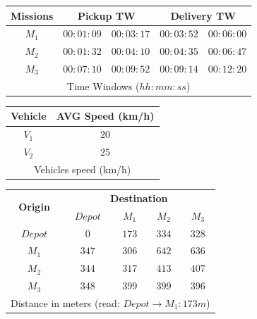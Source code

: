 \documentclass[review]{elsarticle}
\begin{document}
\begin{figure}[h]
\label{example}
 \tiny
 \begin{center}
    \begin{tabular}{|c|c|c|c|c|} 
    \hline
    {\bf Missions} & \multicolumn{2}{|c|}{\bf Pickup TW} & \multicolumn{2}{|c|}{\bf Delivery TW} \\ \hline
    $M_1$	 & $00:01:09$ & $00:03:17$	& $00:03:52$ & $00:06:00$\\
    $M_2$	 & $00:01:32$ & $00:04:10$	& $00:04:35$ & $00:06:47$\\
    $M_3$	 & $00:07:10$ & $00:09:52$	& $00:09:14$ & $00:12:20$\\
    \hline
    \multicolumn{5}{c}{Time Windows ($hh:mm:ss$)}
    \end{tabular}
\end{center}
\begin{center}
    \begin{tabular}{|c|c|} 
    \hline
    {\bf Vehicle} & {\bf AVG Speed (km/h)} \\ \hline
    $V_1$	 & $20$\\
    $V_2$	 & $25$\\
    \hline
    \multicolumn{2}{c}{Vehicles speed (km/h)}
    \end{tabular}
  \end{center}
  
  \begin{center}
    \begin{tabular}{|c|c|c|c|c|} 
    \hline
    
    \multirow{2}{*}{\bf{Origin}} & \multicolumn{4}{c|}{\bf{Destination}}\\ \cline{2-5}
    	 	& {\bf $Depot$}	& {\bf $M_1$}	& $M_2$		& $M_3$\\ \hline
    {\bf $Depot$}	& $0$		& $173$		& $334$		& $328$\\
    {\bf $M_1$}		& $347$		& $306$		& $642$		& $636$\\
    {\bf $M_2$}		& $344$		& $317$		& $413$		& $407$\\
    {\bf $M_3$}		& $348$		& $399$		& $399$		& $396$\\
    \hline
    \multicolumn{5}{c}{Distance in meters (read: $Depot\rightarrow M_1 : 173 m$)}
    \end{tabular}

  \end{center}


\end{figure}
\end{document}
